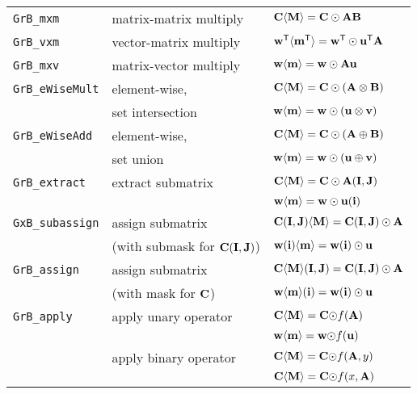 \documentclass[12pt]{article}
\begin{document}
\vspace{0.05in}
{\footnotesize
\begin{tabular}{lll}
\hline
\verb'GrB_mxm'       & matrix-matrix multiply  & ${\bf C \langle M \rangle = C \odot AB}$ \\
\verb'GrB_vxm'       & vector-matrix multiply  & ${\bf w^{\sf T}\langle m^{\sf T}\rangle = w^{\sf T}\odot u^{\sf T}A}$ \\
\verb'GrB_mxv'       & matrix-vector multiply  & ${\bf w \langle m \rangle = w \odot Au}$ \\
\hline
\verb'GrB_eWiseMult' & element-wise,           & ${\bf C \langle M \rangle = C \odot (A \otimes B)}$ \\
                     & set intersection        & ${\bf w \langle m \rangle = w \odot (u \otimes v)}$ \\
\hline
\verb'GrB_eWiseAdd'  & element-wise,           & ${\bf C \langle M \rangle = C \odot (A \oplus  B)}$ \\
                     & set union               & ${\bf w \langle m \rangle = w \odot (u \oplus  v)}$ \\
\hline
\verb'GrB_extract'   & extract submatrix       & ${\bf C \langle M \rangle = C \odot A(I,J)}$ \\
                     &                         & ${\bf w \langle m \rangle = w \odot u(i)}$ \\
\hline
\verb'GxB_subassign' & assign submatrix        & ${\bf C (I,J) \langle M \rangle = C(I,J) \odot A}$ \\
                     & (with submask for ${\bf C(I,J)}$)
                                               & ${\bf w (i)   \langle m \rangle = w(i)   \odot u}$ \\
\hline
\verb'GrB_assign'    & assign submatrix        & ${\bf C \langle M \rangle (I,J) = C(I,J) \odot A}$ \\
                     & (with mask for ${\bf C}$)
                                               & ${\bf w \langle m \rangle (i)   = w(i)   \odot u}$ \\
\hline
\verb'GrB_apply'     & apply unary operator    & ${\bf C \langle M \rangle = C \odot} f{\bf (A)}$ \\
                     &                         & ${\bf w \langle m \rangle = w \odot} f{\bf (u)}$ \\
                     & apply binary operator   & ${\bf C \langle M \rangle = C \odot} f({\bf A},y)$ \\
                     &                         & ${\bf C \langle M \rangle = C \odot} f(x,{\bf A})$ \\

\end{tabular}}
\end{document}
